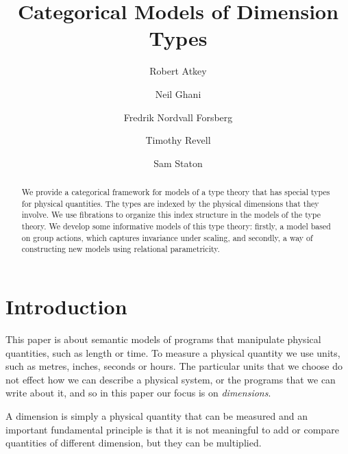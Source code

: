 \documentclass[a4paper,UKenglish]{lipics}
\title{Categorical Models of Dimension Types}
\author[1]{Robert Atkey}
\author[2]{Neil Ghani}
\author[2]{Fredrik Nordvall Forsberg}
\author[2]{Timothy Revell}
\author[3]{Sam Staton}
\affil[1]{University of Edinburgh}
\affil[2]{University of Strathclyde}
\affil[3]{University of Cambridge}
\newcommand{\UoM}{Units of Measure\xspace}
\newcommand{\UoMFibrations}{UoM-fibrations\xspace}
\begin{document}
\maketitle

\begin{abstract}
We provide a categorical framework for models of a type theory that has special types for physical quantities. The types are indexed by the physical dimensions that they involve. We use fibrations to organize this index structure in the models of the type theory. We develop some informative models of this type theory: firstly, a model based on group actions, which captures invariance under scaling, and secondly, a way of constructing new models using relational parametricity.

%
\end{abstract}

\section{Introduction}
This paper is about semantic models of programs that manipulate physical quantities, such as length or time. To measure a physical quantity we use units, such as metres, inches, seconds or hours. The particular units that we choose do not effect how we can describe a physical system, or the programs that we can write about it, and so in this paper our focus is on \emph{dimensions}.

A dimension is simply a physical quantity that can be measured and an important fundamental principle is that it is not meaningful to add or compare quantities of different dimension, but they can be multiplied.
\end{document}
